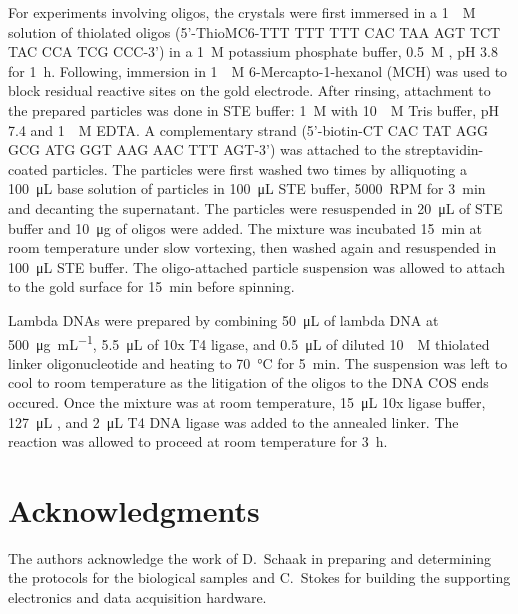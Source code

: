\documentclass[floatfix,superscriptaddress,a4paper,twocolumn]{revtex4-1}
\begin{document}
For experiments involving oligos, the crystals were first immersed in a
\SI{1}{\micro\textsc{M}} solution of thiolated oligos (5'-ThioMC6-TTT TTT
TTT CAC TAA AGT TCT TAC CCA TCG CCC-3') in a \SI{1}{\textsc{M}} potassium
phosphate buffer, \SI{0.5}{\textsc{M}} , pH 3.8 for
\SI{1}{\hour}.  Following, immersion in \SI{1}{\milli\textsc{M}}
6-Mercapto-1-hexanol (MCH) was used to block residual reactive sites on the
gold electrode.  After rinsing, attachment to the prepared particles was
done in STE buffer: \SI{1}{\textsc{M}}  with
\SI{10}{\milli\textsc{M}} Tris buffer, pH 7.4 and \SI{1}{\milli\textsc{M}}
EDTA\@.  A complementary strand (5'-biotin-CT CAC TAT AGG GCG ATG GGT AAG
AAC TTT AGT-3') was attached to the streptavidin-coated particles.  The
particles were first washed two times by alliquoting a
\SI{100}{\micro\liter} base solution of particles in \SI{100}{\micro\liter}
STE buffer, \SI{5000}{RPM} for \SI{3}{\minute} and decanting the
supernatant.  The particles were resuspended in \SI{20}{\micro\liter} of
STE buffer and \SI{10}{\micro\gram} of oligos were added.  The mixture was
incubated \SI{15}{\minute} at room temperature under slow vortexing, then
washed again and resuspended in \SI{100}{\micro\liter} STE buffer.  The
oligo-attached particle suspension was allowed to attach to the gold
surface for \SI{15}{\minute} before spinning.

Lambda DNAs were prepared by combining \SI{50}{\micro\liter} of lambda DNA
at \SI{500}{\micro\gram\per\milli\liter}, \SI{5.5}{\micro\liter} of 10x T4
ligase, and \SI{0.5}{\micro\liter} of diluted \SI{10}{\micro\textsc{M}}
thiolated linker oligonucleotide and heating to \SI{70}{\celsius} for
\SI{5}{\minute}.  The suspension was left to cool to room temperature as
the litigation of the oligos to the DNA COS ends occured. Once the mixture
was at room temperature, \SI{15}{\micro\liter} 10x ligase buffer,
\SI{127}{\micro\liter} , and \SI{2}{\micro\liter} T4 DNA ligase was
added to the annealed linker.  The reaction was allowed to proceed at room
temperature for \SI{3}{\hour}.

\section*{Acknowledgments}
\label{sec:acknowledgements}
The authors acknowledge the work of D\@.~Schaak in preparing and determining
the protocols for the biological samples and C\@.~Stokes for building the
supporting electronics and data acquisition hardware.
\end{document}
